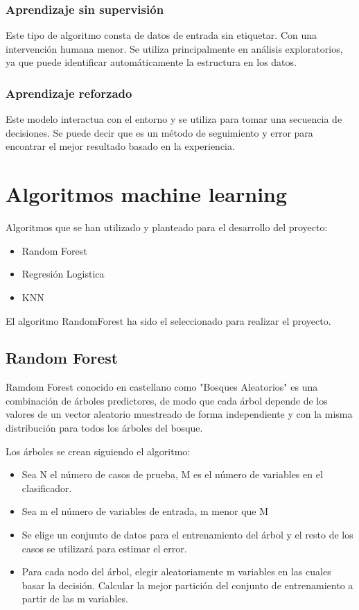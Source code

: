 \subsubsection{Aprendizaje sin supervisión}

Este tipo de algoritmo consta de datos de entrada sin etiquetar. Con una intervención humana menor. Se utiliza principalmente en análisis exploratorios, ya que puede identificar automáticamente la estructura en los datos.

\subsubsection{Aprendizaje reforzado}

Este modelo interactua con el entorno y se utiliza para tomar una secuencia de decisiones. Se puede decir que es un método de seguimiento y error para encontrar el mejor resultado basado en la experiencia.

\section{Algoritmos machine learning}

Algoritmos que se han utilizado y planteado para el desarrollo del proyecto:

\begin{itemize}
\item Random Forest
\item Regresión Logistica
\item KNN
\end{itemize}

El algoritmo RandomForest ha sido el seleccionado para realizar el proyecto.

\subsection{Random Forest}

Ramdom Forest conocido en castellano como "Bosques Aleatorios" es una combinación de árboles predictores, de modo que cada árbol depende de los valores de un vector aleatorio muestreado de forma independiente y con la misma distribución para todos los árboles del bosque.

Los árboles se crean siguiendo el algoritmo:


\begin{itemize}
\item Sea N el número de casos de prueba, M es el número de variables en el clasificador.
\item Sea m el número de variables de entrada, m menor que M
\item Se elige un conjunto de datos para el entrenamiento del árbol y el resto de los casos se utilizará para estimar el error.
\item Para cada nodo del árbol, elegir aleatoriamente m variables en las cuales basar la decisión. Calcular la mejor partición del conjunto de entrenamiento a partir de las m variables.
\end{itemize}

